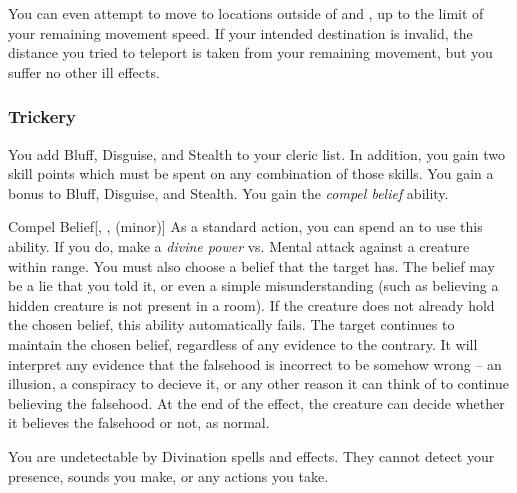            You can even attempt to move to locations outside of  and , up to the limit of your remaining movement speed.
            If your intended destination is invalid, the distance you tried to teleport is taken from your remaining movement, but you suffer no other ill effects.

        \subsubsection{Trickery}
             You add Bluff, Disguise, and Stealth to your cleric  list.
            In addition, you gain two skill points which must be spent on any combination of those skills.
             You gain a  bonus to Bluff, Disguise, and Stealth.
             You gain the \textit{compel belief} ability.
            \begin{ability}{Compel Belief}[, ,  (minor)]
                As a standard action, you can spend an  to use this ability.
                If you do, make a \textit{divine power} vs. Mental attack against a creature within \rngmed range.
                You must also choose a belief that the target has.
                The belief may be a lie that you told it, or even a simple misunderstanding (such as believing a hidden creature is not present in a room).
                If the creature does not already hold the chosen belief, this ability automatically fails.
                \hit The target continues to maintain the chosen belief, regardless of any evidence to the contrary.
                It will interpret any evidence that the falsehood is incorrect to be somehow wrong -- an illusion, a conspiracy to decieve it, or any other reason it can think of to continue believing the falsehood.
                At the end of the effect, the creature can decide whether it believes the falsehood or not, as normal.
            \end{ability}
             You are undetectable by Divination spells and effects.
            They cannot detect your presence, sounds you make, or any actions you take.

